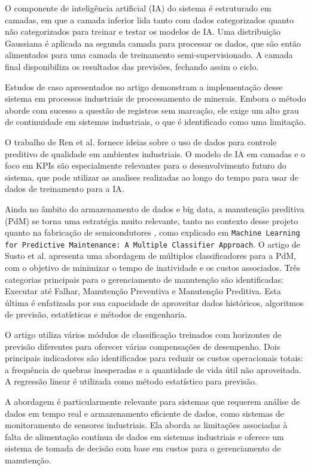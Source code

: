 O componente de inteligência artificial (IA) do sistema é estruturado em camadas, em que a camada inferior lida tanto com dados categorizados quanto não categorizados para treinar e testar os modelos de IA. Uma distribuição Gaussiana é aplicada na segunda camada para processar os dados, que são então alimentados para uma camada de treinamento semi-supervisionado. A camada final disponibiliza os resultados das previsões, fechando assim o ciclo.

Estudos de caso apresentados no artigo demonstram a implementação desse sistema em processos industriais de processamento de minerais. Embora o método aborde com sucesso a questão de registros sem marcação, ele exige um alto grau de continuidade em sistemas industriais, o que é identificado como uma limitação.

O trabalho de Ren et al. fornece ideias sobre o uso de dados para controle preditivo de qualidade em ambientes industriais. O modelo de IA em camadas e o foco em KPIs são especialmente relevantes para o desenvolvimento futuro do sistema, que pode utilizar as analises realizadas ao longo do tempo para usar de dados de treinamento para a IA.

Ainda no âmbito do armazenamento de dados e big data, a manutenção preditiva (PdM) se torna uma estratégia muito relevante, tanto no contexto desse projeto quanto na fabricação de semicondutores \cite{susto2015machine}, como explicado em \texttt{Machine Learning for Predictive Maintenance: A Multiple Classifier Approach}. O artigo de Susto et al.\cite{susto2015machine} apresenta uma abordagem de múltiplos classificadores para a PdM, com o objetivo de minimizar o tempo de inatividade e os custos associados. Três categorias principais para o gerenciamento de manutenção são identificadas: Executar até Falhar, Manutenção Preventiva e Manutenção Preditiva. Esta última é enfatizada por sua capacidade de aproveitar dados históricos, algoritmos de previsão, estatísticas e métodos de engenharia.

O artigo utiliza vários módulos de classificação treinados com horizontes de previsão diferentes para oferecer várias compensações de desempenho. Dois principais indicadores são identificados para reduzir os custos operacionais totais: a frequência de quebras inesperadas e a quantidade de vida útil não aproveitada. A regressão linear é utilizada como método estatístico para previsão.

A abordagem é particularmente relevante para sistemas que requerem análise de dados em tempo real e armazenamento eficiente de dados, como sistemas de monitoramento de sensores industriais. Ela aborda as limitações associadas à falta de alimentação contínua de dados em sistemas industriais e oferece um sistema de tomada de decisão com base em custos para o gerenciamento de manutenção.

